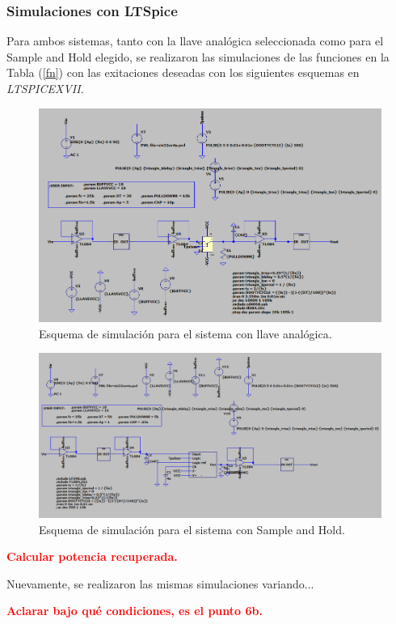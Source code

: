 \subsubsection{Simulaciones con LTSpice}
Para ambos sistemas, tanto con la llave analógica seleccionada como para el Sample and Hold elegido, se realizaron las simulaciones de las funciones en la Tabla (\ref{fn}) con las exitaciones deseadas con los siguientes esquemas en \textit{LTSPICEXVII}.

\begin{figure}[H]
\centering
\includegraphics[width=\textwidth]{ImagenesEjercicio6/SIMULACIONLLAVE.png}
\caption{Esquema de simulación para el sistema con llave analógica.}
\end{figure}

\begin{figure}[H]
\centering
\includegraphics[width=\textwidth]{ImagenesEjercicio6/SIMULACIONSH.png}
\caption{Esquema de simulación para el sistema con Sample and Hold.}
\end{figure}

\textcolor{red}{\textbf{Calcular potencia recuperada.}}

Nuevamente, se realizaron las mismas simulaciones variando...

\textcolor{red}{\textbf{Aclarar bajo qué condiciones, es el punto 6b.}}

